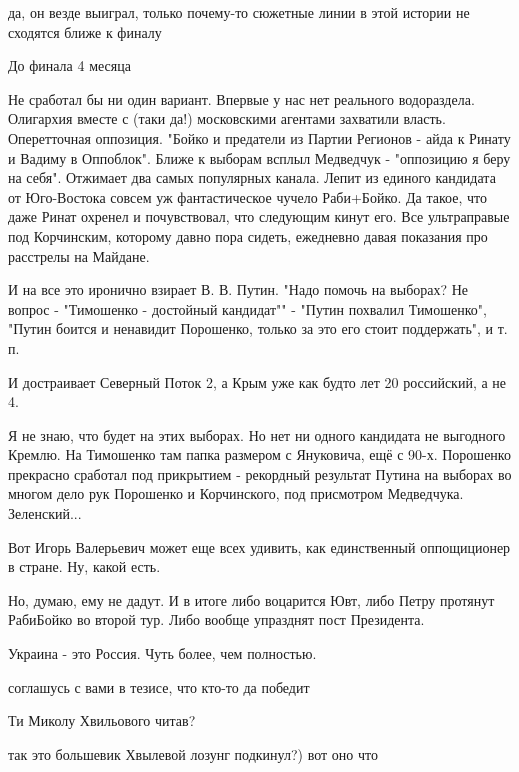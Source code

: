 \begin{itemize}
\begin{itemize} %
да, он везде выиграл, только почему-то сюжетные линии в этой истории не сходятся ближе к финалу

До финала 4 месяца
\end{itemize} %


Не сработал бы ни один вариант. Впервые у нас нет реального водораздела.
Олигархия вместе с (таки да!) московскими агентами захватили власть.
Оперетточная оппозиция. "Бойко и предатели из Партии Регионов - айда к Ринату и
Вадиму в Оппоблок". Ближе к выборам всплыл Медведчук - "оппозицию я беру на
себя". Отжимает два самых популярных канала. Лепит из единого кандидата от
Юго-Востока совсем уж фантастическое чучело Раби+Бойко. Да такое, что даже
Ринат охренел и почувствовал, что следующим кинут его. Все ультраправые под
Корчинским, которому давно пора сидеть, ежедневно давая показания про расстрелы
на Майдане.

И на все это иронично взирает В. В. Путин. "Надо помочь на выборах? Не вопрос -
"Тимошенко - достойный кандидат"" - "Путин похвалил Тимошенко", "Путин боится и
ненавидит Порошенко, только за это его стоит поддержать", и т. п.

И достраивает Северный Поток 2, а Крым уже как будто лет 20 российский, а не 4.

Я не знаю, что будет на этих выборах. Но нет ни одного кандидата не выгодного
Кремлю. На Тимошенко там папка размером с Януковича, ещё с 90-х. Порошенко
прекрасно сработал под прикрытием - рекордный результат Путина на выборах во
многом дело рук Порошенко и Корчинского, под присмотром Медведчука.
Зеленский...

Вот Игорь Валерьевич может еще всех удивить, как единственный оппощиционер в
стране. Ну, какой есть.

Но, думаю, ему не дадут. И в итоге либо воцарится Ювт, либо Петру протянут
РабиБойко во второй тур. Либо вообще упразднят пост Президента.

Украина - это Россия. Чуть более, чем полностью.

\begin{itemize} %
соглашусь с вами в тезисе, что кто-то да победит

\end{itemize} %

Ти Миколу Хвильового читав?

\begin{itemize} %
так это большевик Хвылевой лозунг подкинул?) вот оно что


\end{itemize}
\end{itemize}

